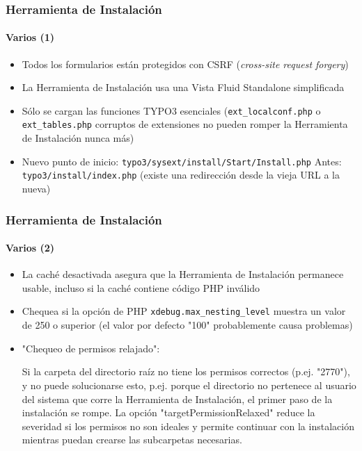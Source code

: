 
\begin{frame}[fragile]
	\frametitle{Herramienta de Instalación}
	\framesubtitle{Varios (1)}

	\begin{itemize}
		\item Todos los formularios están protegidos con CSRF\newline
			  (\textit{cross-site request forgery})
		\item La Herramienta de Instalación usa una\newline
		 	  Vista Fluid Standalone simplificada
		\item Sólo se cargan las funciones TYPO3 esenciales\newline
			(\texttt{ext\_localconf.php} o \texttt{ext\_tables.php} corruptos de extensiones no pueden romper la Herramienta de Instalación nunca más)
		\item Nuevo punto de inicio:\newline
			\texttt{typo3/sysext/install/Start/Install.php}\newline
			Antes:					\tabto{3.2cm} \texttt{typo3/install/index.php}\newline
									\tabto{3.2cm} (existe una redirección desde la vieja URL a la nueva)
	\end{itemize}

\end{frame}

\begin{frame}[fragile]
	\frametitle{Herramienta de Instalación}
	\framesubtitle{Varios (2)}

	\begin{itemize}
		\item La caché desactivada asegura que la Herramienta de Instalación permanece usable, incluso si la caché contiene código PHP inválido
		\item Chequea si la opción de PHP \texttt{xdebug.max\_nesting\_level} muestra un valor de 250 o superior (el valor por defecto "100" probablemente causa problemas)
		\item "Chequeo de permisos relajado":

			\small
				Si la carpeta del directorio raíz no tiene los permisos correctos  (p.ej. "2770"),
				y no puede solucionarse esto, p.ej. porque el directorio no pertenece
				al usuario del sistema que corre la Herramienta de Instalación, el primer paso de la instalación
				se rompe.
				La opción "targetPermissionRelaxed" reduce la severidad si los permisos no son
				ideales y permite continuar con la instalación mientras puedan crearse las subcarpetas necesarias.
			\normalsize
	\end{itemize}

\end{frame}

